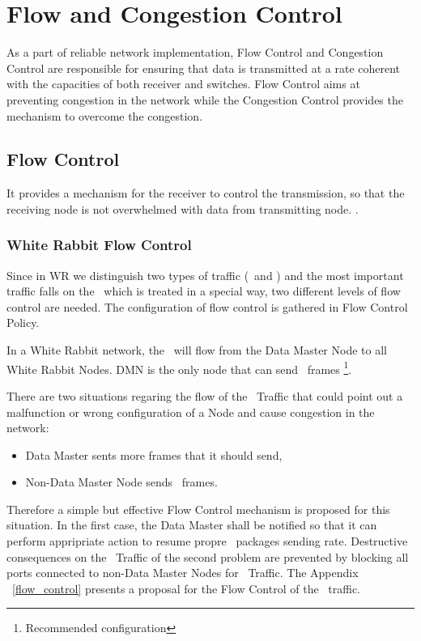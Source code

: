 \section{Flow and Congestion Control}
\label{chap:flow_congestion}

As a part of reliable network implementation, Flow Control and Congestion
Control are responsible for ensuring that data is transmitted at a rate coherent
with the capacities of both receiver and switches. Flow Control aims at
preventing congestion in the network while the Congestion Control provides the
mechanism to overcome the congestion.


\subsection{Flow Control}
It provides a mechanism for the receiver to control the transmission, so that
the receiving node is not overwhelmed with data from transmitting node. 
\cite{atm_traffic}. 

\vspace{10 mm}

\subsubsection{White Rabbit Flow Control}

Since in WR we distinguish two types of traffic (\HP\ and \SP) and the most
important traffic falls on the \HP\ which is treated in a special way, two
different levels of flow control are needed. The configuration of flow control
is gathered in Flow Control Policy.

In a White Rabbit network, the \HP\ will flow from the Data Master Node to all
White Rabbit Nodes. DMN is the only node that can send \HighPriority\ 
frames \footnote{Recommended configuration}. 

There are two situations regaring the flow of the \HP\ Traffic that could point
out a malfunction or wrong configuration of a Node and cause congestion in the
network:
\begin{itemize}
    \item Data Master sents more frames that it should send,
    \item Non-Data Master Node sends \HP\ frames.
\end{itemize}
Therefore a simple but effective Flow Control mechanism is proposed for this
situation. In the first case, the Data Master shall be notified so that it can
perform appripriate action to resume propre \HP\ packages sending rate.
Destructive consequences on the \HP\ Traffic of the second problem are prevented
by blocking all ports connected to non-Data Master Nodes for \HP\ Traffic. The
Appendix ~\ref{flow_control} presents a proposal for the Flow Control of the
\HP\ traffic.
 
